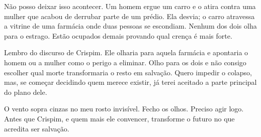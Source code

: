 Não posso deixar isso acontecer. Um homem ergue um carro e o atira contra uma mulher que acabou de derrubar parte de um prédio. Ela desvia; o carro atravessa a vitrine de uma farmácia onde duas pessoas se escondiam. Nenhum dos dois olha para o estrago. Estão ocupados demais provando qual crença é mais forte.

Lembro do discurso de Crispim. Ele olharia para aquela farmácia e apontaria o homem ou a mulher como o perigo a eliminar. Olho para os dois e não consigo escolher qual morte transformaria o resto em salvação. Quero impedir o colapso, mas, se começar decidindo quem merece existir, já terei aceitado a parte principal do plano dele.

O vento sopra cinzas no meu rosto invisível.  
Fecho os olhos.  
Preciso agir logo.  
Antes que Crispim, e quem mais ele convencer, transforme o futuro no que acredita ser salvação.
